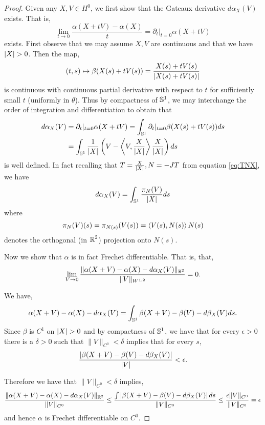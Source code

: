 \documentclass[12pt]{article}
\begin{document}
\begin{proof}
Given any \(X,V \in H^0\), we first show that the Gateaux derivative \(d\alpha_X (V)\) exists. That is,
\[
\lim_{t\to 0} \frac{\alpha(X + t V) - \alpha(X)}{t} = \partial_t|_{t=0} \alpha(X + tV)
\]
exists. First observe that we may assume \(X, V\) are continuous and that we have \(\left|{X}\right| > 0\). Then the map,
\[
(t, s) \mapsto \beta(X(s) + t V(s)) = \frac{X(s) + t V(s)}{\left|{X(s) + t V(s)}\right|}
\]
is continuous with continuous partial derivative with respect to \(t\) for sufficiently small \(t\) (uniformly in \(\theta\)). Thus by compactness of \(\operatorname{\mathbb{S}^1}\), we may interchange the order of integration and differentiation to obtain that
\[
\begin{split}
d\alpha_X (V) &= \partial_t|_{t=0} \alpha(X + tV) = \int_{\operatorname{\mathbb{S}^1}} \partial_t|_{t=0} \beta (X(s) + tV(s))  ds \\
&= \int_{\operatorname{\mathbb{S}^1}} \frac{1}{\left|{X}\right|}\left(V - \left\langle{V},{\frac{X}{\left|{X}\right|}}\right\rangle \frac{X}{\left|{X}\right|}\right) ds
\end{split}
\]
is well defined. In fact recalling that \(T = \tfrac{X}{\left|{X}\right|}, N = -J T\) from equation \eqref{eq:TNX}, we have
\begin{equation}
\label{eq:alphagateaux}
d\alpha_X (V) = \int_{\operatorname{\mathbb{S}^1}} \frac{\pi_N(V)}{\left|{X}\right|} ds
\end{equation}
where
\[
\pi_N (V) (s)= \pi_{N (s)} (V(s)) = \left\langle{V(s)},{N(s)}\right\rangle N(s)
\]
denotes the orthogonal (in \(\operatorname{\mathbb{R}}^2\)) projection onto \(N(s)\).

Now we show that \(\alpha\) is in fact Frechet differentiable. That is, that,
\[
\lim_{V \to 0} \frac{\|\alpha(X + V) - \alpha(X) - d\alpha_X(V)\|_{\operatorname{\mathbb{R}}^2}}{\|V\|_{W^{1,2}}} = 0.
\]

We have,
\[
\alpha(X + V) - \alpha(X) - d\alpha_X(V) = \int_{\operatorname{\mathbb{S}^1}} \beta(X + V) - \beta(V) - d\beta_X(V) ds.
\]
Since \(\beta\) is \(C^1\) on \(\left|{X}\right| > 0\) and by compactness of \(\operatorname{\mathbb{S}^1}\), we have that for every \(\epsilon > 0\) there is a \(\delta > 0\) such that \(\|V\|_{C^0} < \delta\) implies that for every \(s\),
\[
\frac{\left|{\beta(X + V) - \beta(V) - d\beta_X(V)}\right|}{\left|{V}\right|} < \epsilon.
\]

Therefore we have that \(\|V\|_{C^0} < \delta\) implies,
\[
\begin{split}
\frac{\|\alpha(X + V) - \alpha(X) - d\alpha_X(V)\|_{\operatorname{\mathbb{R}}^2}}{\|V\|_{C^0}} \leq \frac{\int\left|{\beta(X + V) - \beta(V) - d\beta_X (V)}\right|ds}{\|V\|_{C^0}} \leq \frac{\epsilon \|V\|_{C^0}}{\|V\|_{C^0}} = \epsilon
\end{split}
\]
and hence \(\alpha\) is Frechet differentiable on \(C^0\).


\end{proof}
\end{document}
